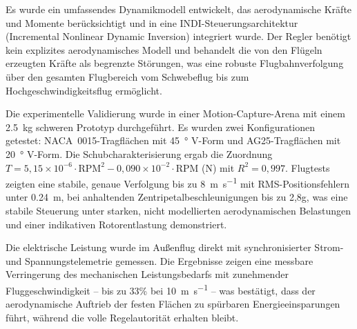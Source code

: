 Es wurde ein umfassendes Dynamikmodell entwickelt, das aerodynamische Kräfte und Momente berücksichtigt und in eine INDI-Steuerungsarchitektur (Incremental Nonlinear Dynamic Inversion) integriert wurde. Der Regler benötigt kein explizites aerodynamisches Modell und behandelt die von den Flügeln erzeugten Kräfte als begrenzte Störungen, was eine robuste Flugbahnverfolgung über den gesamten Flugbereich vom Schwebeflug bis zum Hochgeschwindigkeitsflug ermöglicht.

Die experimentelle Validierung wurde in einer Motion-Capture-Arena mit einem \SI{2,5}{\kilogram} schweren Prototyp durchgeführt. Es wurden zwei Konfigurationen getestet: NACA~0015-Tragflächen mit \SI{45}{\degree} V-Form und AG25-Tragflächen mit \SI{20}{\degree} V-Form. Die Schubcharakterisierung ergab die Zuordnung $T = 5{,}15 \times 10^{-6} \cdot \text{RPM}^2 - 0{,}090 \times 10^{-2} \cdot \text{RPM}$ (N) mit $R^2 = 0{,}997$. Flugtests zeigten eine stabile, genaue Verfolgung bis zu \SI{8}{\meter\per\second} mit RMS-Positionsfehlern unter \SI{0,24}{\meter}, bei anhaltenden Zentripetalbeschleunigungen bis zu 2,8g, was eine stabile Steuerung unter starken, nicht modellierten aerodynamischen Belastungen und einer indikativen Rotorentlastung demonstriert.

Die elektrische Leistung wurde im Außenflug direkt mit synchronisierter Strom- und Spannungstelemetrie gemessen. Die Ergebnisse zeigen eine messbare Verringerung des mechanischen Leistungsbedarfs mit zunehmender Fluggeschwindigkeit -- bis zu 33\% bei \SI{10}{\meter\per\second} -- was bestätigt, dass der aerodynamische Auftrieb der festen Flächen zu spürbaren Energieeinsparungen führt, während die volle Regelautorität erhalten bleibt.
